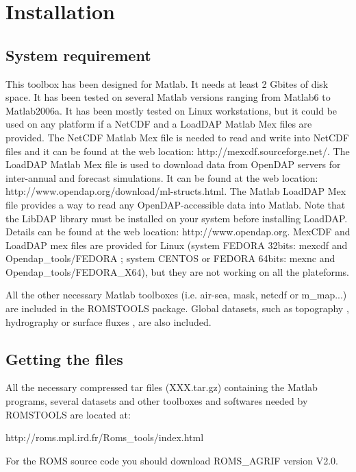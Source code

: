 \section{Installation}
\subsection{System requirement}
This toolbox has been designed for Matlab. It needs at least 
2 Gbites of disk space. It has been tested on several 
Matlab versions ranging from Matlab6 to Matlab2006a. It has been 
mostly tested on Linux workstations, but it could be used 
on any platform if a NetCDF and a LoadDAP  Matlab Mex files  
are provided. The NetCDF Matlab Mex file is needed to read 
and write into NetCDF files and it can be found at the web 
location: http://mexcdf.sourceforge.net/. The LoadDAP Matlab Mex file
is used to download data from OpenDAP servers for inter-annual and forecast 
simulations. It can be found at the web location: 
http://www.opendap.org/download/ml-structs.html. The Matlab 
LoadDAP Mex file provides a way to read any OpenDAP-accessible 
data into Matlab. Note that the LibDAP library must be installed
on your system before installing LoadDAP. Details can be found 
at the web location: http://www.opendap.org. MexCDF and LoadDAP mex 
files are provided for Linux (system FEDORA 32bits: mexcdf and 
Opendap\_tools/FEDORA ; system CENTOS or FEDORA 64bits: 
mexnc and Opendap\_tools/FEDORA\_X64), but they are not working 
on all the plateforms.

All the other necessary Matlab toolboxes (i.e. air-sea, mask, 
netcdf or m\_map...) are included in the ROMSTOOLS package. 
Global datasets, such as topography \citep{Smi97}, 
hydrography \citep{Con02} or surface fluxes \citep{Das94}, are 
also included.

\subsection{Getting the files}

All the necessary compressed tar files (XXX.tar.gz) containing 
the Matlab programs, several datasets  and other toolboxes and 
softwares needed by ROMSTOOLS are located at:
\begin{center}
http://roms.mpl.ird.fr/Roms\_tools/index.html 
\end{center}
For the ROMS source code you should download ROMS\_AGRIF version
V2.0.\\\\\\\\\\\\


